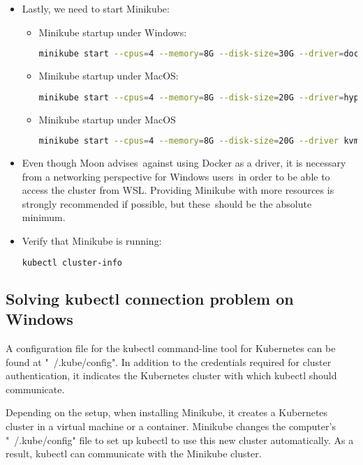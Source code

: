 \begin{itemize}
	\item Lastly, we need to start Minikube:
	\begin{itemize}
		\item Minikube startup under Windows:
		\begin{lstlisting}[language=bash]
			minikube start --cpus=4 --memory=8G --disk-size=30G --driver=docker
		\end{lstlisting}
		\item Minikube startup under MacOS:
		\begin{lstlisting}[language=bash]
			minikube start --cpus=4 --memory=8G --disk-size=20G --driver=hyperkit
		\end{lstlisting}
		\item Minikube startup under MacOS
		\begin{lstlisting}[language=bash]
			minikube start --cpus=4 --memory=8G --disk-size=20G --driver kvm2
		\end{lstlisting}
	\end{itemize}
	\item Even though Moon advises against using Docker as a driver, it is necessary from a networking perspective for Windows users in order to be able to access the cluster from WSL. Providing Minikube with more resources is strongly recommended if possible, but these should be the absolute minimum.
	\item Verify that Minikube is running:
	\begin{lstlisting}[language=bash]
		kubectl cluster-info
	\end{lstlisting}
\end{itemize}

\subsection{Solving kubectl connection problem on Windows}

A configuration file for the kubectl command-line tool for Kubernetes can be found at "~/.kube/config". In addition to the credentials required for cluster authentication, it indicates the Kubernetes cluster with which kubectl should communicate.

Depending on the setup, when installing Minikube, it creates a Kubernetes cluster in a virtual machine or a container. Minikube changes the computer's "~/.kube/config" file to set up kubectl to use this new cluster automatically. As a result, kubectl can communicate with the Minikube cluster.

